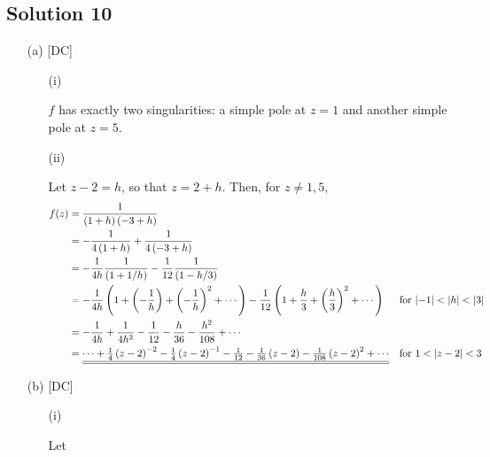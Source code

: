 
%
%

\subsection*{Solution 10}

\begin{itemize}
\item[(a)][DC]

\begin{itemize}
\item[(i)]

$f$ has exactly two singularities: a simple pole at $ z = 1 $ and
another simple pole at $ z = 5 $.

\item[(ii)]

Let $ z - 2 = h $, so that $ z = 2 + h $. Then, for $ z \neq 1 , 5 $,
\begin{align*}
	f ( z )
	&=
	\frac{1}{\left(1 + h\right)\left(-3 + h\right)}
	\\
	&=
	- \frac{1}{4 \left( 1 + h \right)} + \frac{1}{4 \left( -3 + h \right)}
	\\
	&=
	- \frac{1}{4 h} \frac{1}{\left( 1 + 1/h \right)} - \frac{1}{12} \frac{1}{\left( 1 - h/3 \right)}
	\\
	&=
	- \frac{1}{4 h} \left( 1 + \left(-\frac{1}{h}\right) + \left(-\frac{1}{h}\right)^2 + \cdots \right) - \frac{1}{12} \left( 1 + \frac{h}{3} + \left(\frac{h}{3}\right)^2 + \cdots \right)
	&&\text{for $ \left\lvert-1\right\rvert < \left\lvert h\right\rvert < \left\lvert3\right\rvert $}
	\\
	&=
	- \frac{1}{4 h} + \frac{1}{4 h^2} - \frac{1}{12} - \frac{h}{36} - \frac{h^2}{108} + \cdots
	\\
	&=
	\underline{\underline{
	\cdots + \tfrac{1}{4} \left(z - 2\right)^{-2} - \tfrac{1}{4} \left(z - 2\right)^{-1} - \tfrac{1}{12} - \tfrac{1}{36} \left(z - 2\right) - \tfrac{1}{108} \left(z - 2\right)^2 + \cdots
	}}
	&&\text{for $ 1 < \left\lvert z - 2\right\rvert < 3 $}
\end{align*}

\end{itemize}

\item[(b)][DC]

\begin{itemize}
\item[(i)]

Let


\end{itemize}
\end{itemize}
